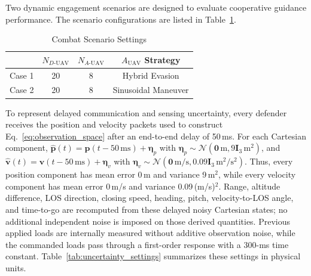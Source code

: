 \documentclass[lettersize,journal]{IEEEtran}
\providecommand{\DIFadd}[1]{{\protect\color{blue}#1}} %
\providecommand{\DIFaddbegin}{} %
\newcommand{\DIFaddincludegraphics}[2][]{{\color{blue}\fbox{\DIFOincludegraphics[#1]{#2}}}} %
\DeclareRobustCommand{\DIFaddbegin}{\DIFOaddbegin \let\includegraphics\DIFaddincludegraphics} %
\begin{document}
Two dynamic engagement scenarios are designed to evaluate cooperative guidance performance.
The scenario configurations are listed in Table~\ref{changjingqingkuang}.

\begin{table}[!t]
\centering
\renewcommand{\arraystretch}{1.4}
\caption{Combat Scenario Settings}
\label{changjingqingkuang}
\begin{tabular}{cccc}
\hline\hline
 & $N_{D\text{-UAV}}$ & $N_{A\text{-UAV}}$ & $A_{\text{UAV}}$ Strategy \\ \hline
Case 1 & 20 & 8 & Hybrid Evasion \\
Case 2 & 20 & 8 & Sinusoidal Maneuver \\ \hline
\end{tabular}
\end{table}

\DIFaddbegin \DIFadd{To represent delayed communication and sensing uncertainty, every defender receives the
position and velocity packets used to construct Eq.~}\eqref{eq:observation_space} \DIFadd{after an
end-to-end delay of 50\,ms. For each Cartesian component,
$\widehat{\mathbf p}(t)=\mathbf p(t-50\,\mathrm{ms})+\boldsymbol\eta_p$ with
$\boldsymbol\eta_p\sim\mathcal N(\mathbf0\,\mathrm{m},9\mathbf I_3\,\mathrm{m}^2)$, and
$\widehat{\mathbf v}(t)=\mathbf v(t-50\,\mathrm{ms})+\boldsymbol\eta_v$ with
$\boldsymbol\eta_v\sim\mathcal N(\mathbf0\,\mathrm{m/s},
0.09\mathbf I_3\,\mathrm{m}^2/\mathrm{s}^2)$. Thus, every position component has mean error
0\,m and variance 9\,m$^2$, while every velocity component has mean error 0\,m/s and variance
0.09\,(m/s)$^2$. Range, altitude difference, LOS direction, closing speed, heading, pitch,
velocity-to-LOS angle, and time-to-go are recomputed from these delayed noisy Cartesian states;
no additional independent noise is imposed on those derived quantities. Previous applied loads
are internally measured without additive observation noise, while the commanded loads pass
through a first-order response with a 300-ms time constant. Table~\ref{tab:uncertainty_settings}
summarizes these settings in physical units.
}
\end{document}
